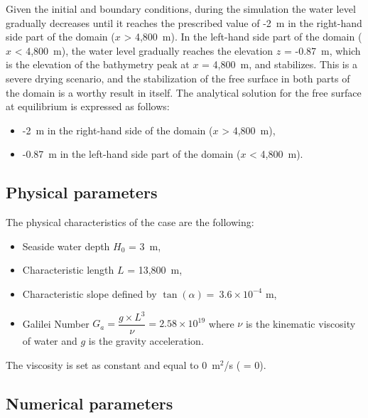 Given the initial and boundary conditions, during the simulation
the water level gradually decreases until it reaches the prescribed value of -2~m
in the right-hand
side part of the domain ($x$ > 4,800~m). In the left-hand side
part of the domain ($x$ < 4,800~m), the water level gradually reaches the
elevation $z$ = -0.87~m, which
is the elevation of the bathymetry peak at $x$ = 4,800~m, and stabilizes.
This is a severe drying scenario,
and the stabilization of the free surface in both parts of the domain is a
worthy result in itself.
The analytical solution for the free surface at equilibrium is expressed as
follows:
\begin{itemize}
\item -2~m in the right-hand side of the domain ($x$ > 4,800~m),
\item -0.87~m in the left-hand side part of the domain ($x$ < 4,800~m).
\end{itemize}

\subsection{Physical parameters}

The physical characteristics of the case are the following:
\begin{itemize}
  \itemsep0em
\item Seaside water depth $H_0$ = 3~m,
\item Characteristic length $L$ = 13,800~m,
\item Characteristic slope defined by $\tan(\alpha) = ~3.6 \times 10^{-4}$ m,
\item Galilei Number \textbf{$G_a = \dfrac{g \times L^3}{\nu} =  2.58 \times 10^{19}$}
  where $\nu$ is the kinematic viscosity of water and $g$ is the gravity acceleration.
\end{itemize}

The viscosity is set as constant and equal to 0~m$^2$/s ( = 0).

\subsection{Numerical parameters}

